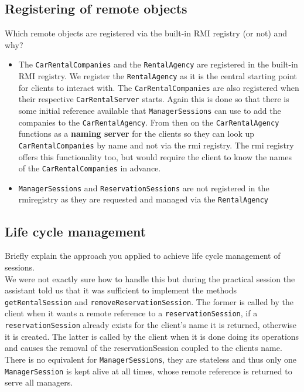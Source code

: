 \documentclass{scrartcl}
\begin{document}
	\subsection{Registering of remote objects}
    Which remote objects are registered via the built-in RMI registry (or not) and why? \\
	\begin{itemize}
		\item The \texttt{CarRentalCompanies} and the \texttt{RentalAgency} are registered in the built-in RMI registry. We register the \texttt{RentalAgency} as it is the central starting point for clients to interact with. The \texttt{CarRentalCompanies} are also registered when their respective \texttt{CarRentalServer} starts. Again this is done so that there is some initial reference available that \texttt{ManagerSessions} can use to add the companies to the \texttt{CarRentalAgency}. From then on the \texttt{CarRentalAgency} functions as a \textbf{naming server} for the clients so they can look up \texttt{CarRentalCompanies} by name and not via the rmi registry. The rmi registry offers this functionality too, but would require the client to know the names of the \texttt{CarRentalCompanies} in advance.
		\item \texttt{ManagerSessions} and \texttt{ReservationSessions} are not registered in the rmiregistry as they are requested and managed via the \texttt{RentalAgency}
	\end{itemize}

    \subsection{Life cycle management}
    Briefly explain the approach you applied to achieve life cycle management of sessions. \\
	We were not exactly sure how to handle this but during the practical session
	the assistant told us that it was sufficient to implement the methods 
	\texttt{getRentalSession} and \texttt{removeReservationSession}. The former is called by the client when it wants a remote reference to a \texttt{reservationSession}, if a \texttt{reservationSession} already exists for the client's name it is returned, otherwise it is created. The latter is called by the client when it is done doing its operations and causes the removal of the reservationSession coupled to the clients name. There is no equivalent for \texttt{ManagerSessions}, they are stateless and thus only one \texttt{ManagerSession} is kept alive at all times, whose remote reference is returned to serve all managers. 
\end{document}
